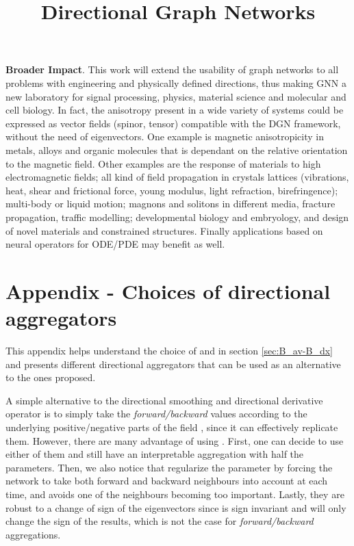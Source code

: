 \documentclass{article} \usepackage{arxiv,times}
\newcommand{\xhdr}[1]{{\noindent\bfseries #1}.}
\renewcommand{\undertitle}{
Anisotropic aggregation in graph neural networks via directional vector fields
}
\begin{document}
\xhdr{Broader Impact}
This work will extend the usability of graph networks to all problems with engineering and physically defined directions, thus making GNN a new laboratory for signal processing, physics, material science and molecular and cell biology.
In fact, the anisotropy present in a wide variety of systems could be expressed as vector fields (spinor, tensor) compatible with the DGN framework, without the need of eigenvectors. One example is magnetic anisotropicity in metals, alloys and organic molecules that is dependant on the relative orientation to the magnetic field.
Other examples are the response of materials to high electromagnetic fields; all kind of field propagation in crystals lattices (vibrations, heat, shear and frictional force, young modulus, light refraction, birefringence); multi-body or liquid motion; magnons and solitons in different media, fracture propagation, traffic modelling; developmental biology and embryology, and design of novel materials and constrained structures. Finally applications based on neural operators for ODE/PDE may benefit as well.













\clearpage
\newpage
\onecolumn

\appendix

\title{Directional Graph Networks}
\renewcommand{\undertitle}{
Anisotropic aggregation in graph neural networks via directional vector fields
}



\section{Appendix - Choices of directional aggregators}
\label{app:agg_choices}

This appendix helps understand the choice of  and  in section \ref{sec:B_av-B_dx} and presents different directional aggregators that can be used as an alternative to the ones proposed. 

A simple alternative to the directional smoothing and directional derivative operator is to simply take the \textit{forward/backward} values according to the underlying positive/negative parts of the field , since it can effectively replicate them. However, there are many advantage of using . First, one can decide to use either of them and still have an interpretable aggregation with half the parameters. Then, we also notice that  regularize the parameter by forcing the network to take both forward and backward neighbours into account at each time, and avoids one of the neighbours becoming too important. Lastly, they are robust to a change of sign of the eigenvectors since  is sign invariant and  will only change the sign of the results, which is not the case for \textit{forward/backward} aggregations.
\end{document}
